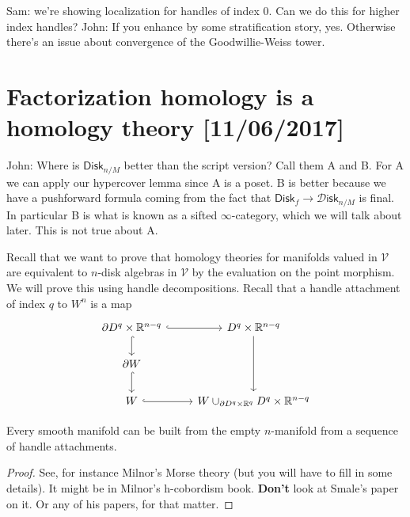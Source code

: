 \documentclass{amsart}
\begin{document}
Sam: we're showing localization for handles of index 0. Can we do this for higher index handles?
John: If you enhance by some stratification story, yes. Otherwise there's an issue about convergence
of the Goodwillie-Weiss tower.

\newpage


\section{Factorization homology is a homology theory [11/06/2017]}

John: Where is $\mathsf{Disk}_{n/M}$ better than the script version? Call them A and B.
For A we can apply our hypercover lemma since A is a poset. B is better because
we have a pushforward formula coming from the fact that $\mathsf{Disk}_f\to \mathcal{D}\mathsf{isk}_{n/M}$
is final. In particular B is what is known as a sifted $\infty$-category, which
we will talk about later. This is not true about A.

Recall that we want to prove that homology theories for manifolds valued in $\mathcal{V}$
are equivalent to $n$-disk algebras in $\mathcal{V}$ by the evaluation on the point morphism.
We will prove this using handle decompositions. Recall that a handle attachment of index $q$ to $W^n$
is a map
\begin{equation*}
    \begin{tikzcd}
        \partial D^q\times\R^{n-q} \rar[hook]\dar[hook] & D^q\times\R^{n-q}\ar[dd] \\
        \partial W\dar[hook] \\
        W \rar[hook] & W\cup_{\partial D^q\times \R^q} D^q\times\R^{n-q}
    \end{tikzcd}
\end{equation*}
\begin{theorem}
    Every smooth manifold can be built from the empty $n$-manifold from a sequence of
    handle attachments.
\end{theorem}
\begin{proof}
    See, for instance Milnor's Morse theory (but you will have to fill in some details).
    It might be in Milnor's h-cobordism book. \textbf{Don't} look at Smale's paper on it.
    Or any of his papers, for that matter.
\end{proof}
\end{document}
